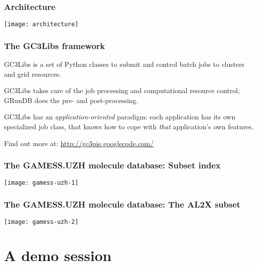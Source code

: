 \documentclass {beamer}
\newcommand{\largeskip}{\vspace{1em}}
\def\+{\largeskip}
\begin{document}
\begin{frame}
  \frametitle{Architecture}

  \begin{center}
    \texttt{[image: architecture]}
  \end{center}
\end{frame}

\begin{frame}
  \frametitle{The GC3Libs framework}

  GC3Libs is a set of Python classes to submit and control batch jobs
  to clusters and grid resources.

  \+ GC3Libs takes care of the job processing and computational
  resource control; GRunDB does the pre- and post-processing.

  \+ GC3Libs has an \emph{application-oriented} paradigm: each
  application has its own specialized job class, that knows how to
  cope with \emph{that} application's own features.

  \+
  \begin{tiny}
    Find out more at: \url{http://gc3pie.googlecode.com/}
  \end{tiny}
\end{frame}

\begin{frame}
  \frametitle{The GAMESS.UZH molecule database: Subset index}
  \begin{center}
    \texttt{[image: gamess-uzh-1]}
  \end{center}
\end{frame}

\begin{frame}
  \frametitle{The GAMESS.UZH molecule database: The AL2X subset}
  \begin{center}
    \texttt{[image: gamess-uzh-2]}
  \end{center}
\end{frame}


\section{A demo session}
\end{document}
